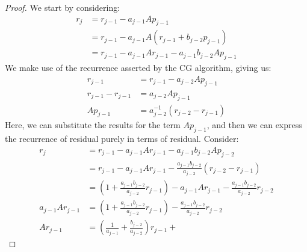\documentclass[]{article}
\theoremstyle{definition}
\begin{document}
            \begin{proof}
                We start by considering: 
                \begin{align}
                    r_j &= r_{j - 1} - a_{j -1 }Ap_{j - 1}
                    \\
                    & =r_{j - 1} - a_{j - 1} A(r_{j - 1} + b_{j - 2}p_{j - 1})
                    \\
                    &= r_{j - 1} - a_{j - 1}Ar_{j - 1} - a_{j - 1}b_{j - 2}Ap_{j - 1}
                \end{align}
                We make use of the recurrence asserted by the CG algorithm, giving us: 
                \begin{align}
                    r_{j - 1} &= r_{j - 1} - a_{j - 2}Ap_{j - 1}
                    \\
                    r_{j - 1} - r_{j - 1} &= a_{j - 2} Ap_{j - 1}
                    \\
                    Ap_{j - 1} &= a^{-1}_{j -2} 
                    \left(
                        r_{j - 2} - r_{j - 1}
                    \right)
                \end{align}
                Here, we can substitute the results for the term $Ap_{j - 1}$, and then we can express the recurrence of residual purely in terms of residual. Consider: 
                \begin{align}
                    r_{j} &= r_{j - 1} - a_{j - 1}Ar_{j - 1} - a_{j - 1}b_{j - 2}Ap_{j - 2}
                    \\
                    &= 
                    r_{j - 1} - a_{j - 1}Ar_{j - 1} - \frac{a_{j-1}b_{j-2}}{a_{j-2}}\left(
                        r_{j - 2} - r_{j - 1}
                    \right)
                    \\
                    &= \left(
                        1 + \frac{a_{j - 1}b_{j -2}}{a_{j - 2}}r_{j - 1}
                    \right)- a_{j - 1}Ar_{j - 1} - \frac{a_{j-1}b_{j-2}}{a_{j-2}}r_{j - 2}
                    \\
                    a_{j - 1}Ar_{j - 1} &= 
                    \left(
                        1 + \frac{a_{j - 1}b_{j -2}}{a_{j - 2}}r_{j - 1}
                    \right)
                    - \frac{a_{j-1}b_{j-2}}{a_{j-2}}r_{j - 2}
                    \\
                    Ar_{j - 1} &=
                    \left(
                        \frac{1}{a_{j - 1}} + \frac{b_{j - 2}}{a_{j- 2}}
                    \right)r_{j - 1} + 

\end{align}
\end{proof}
\end{document}
